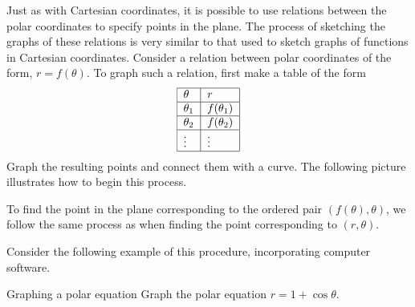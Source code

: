 Just as with Cartesian coordinates, it is possible to use
relations between the polar coordinates to specify points in the plane. The
process of sketching the graphs of these relations is very similar to that used to sketch
graphs of functions in Cartesian coordinates. Consider a relation between polar coordinates of the form, $r=f(\theta)$. To graph such a relation, first make a table of
the form
\begin{equation*}
\begin{tabular}{|l|l|}
\hline
$\theta $ & $r$ \\ \hline
$\theta _{1}$ & $f(\theta _{1}) $ \\ \hline
$\theta _{2}$ & $f(\theta _{2}) $ \\ \hline
$\vdots $ & $\vdots $ \\ \hline
\end{tabular}
\end{equation*}
Graph the resulting points and connect them with a curve. The
following picture illustrates how to begin this process.

\begin{center}
\end{center}

To find the point in the plane corresponding to the ordered pair $(f(
\theta) ,\theta)$, we follow the same process as when finding the point corresponding to $(r, \theta)$.

Consider the following example of this procedure, incorporating computer software.

\begin{example}{Graphing a polar equation}{}
Graph the polar equation $r=1+\cos \theta$.
\end{example}

